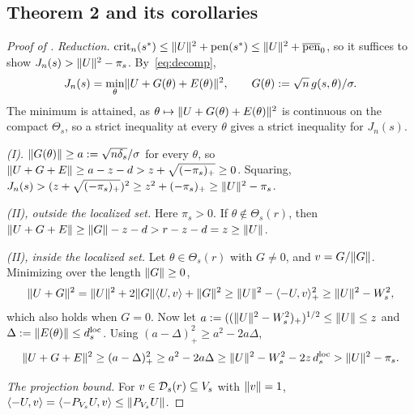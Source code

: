 \subsection{Theorem 2 and its corollaries}
\label{app:thm2}

\begin{proof}[Proof of ]
\emph{Reduction.} $\mathrm{crit}_n(s^*) \le \lVert U\rVert^2 + \mathrm{pen}(s^*) \le \lVert U\rVert^2 + \overline{\mathrm{pen}}_0$, so it suffices to show $J_n(s) > \lVert U\rVert^2 - \pi_s$. By~\eqref{eq:decomp},
\[
J_n(s) = \min_\theta\lVert U + G(\theta) + E(\theta)\rVert^2, \qquad G(\theta) := \sqrt n\,g(s,\theta)/\sigma.
\]
The minimum is attained, as $\theta \mapsto \lVert U + G(\theta) + E(\theta)\rVert^2$ is continuous on the compact $\Theta_s$, so a strict inequality at every $\theta$ gives a strict inequality for $J_n(s)$.

\emph{(I).} $\lVert G(\theta)\rVert \ge a := \sqrt{n\delta_s}/\sigma$ for every $\theta$, so $\lVert U + G + E\rVert \ge a - z - d > z + \sqrt{(-\pi_s)_+} \ge 0$. Squaring, $J_n(s) > (z + \sqrt{(-\pi_s)_+})^2 \ge z^2 + (-\pi_s)_+ \ge \lVert U\rVert^2 - \pi_s$.

\emph{(II), outside the localized set.} Here $\pi_s > 0$. If $\theta \notin \Theta_s(r)$, then $\lVert U + G + E\rVert \ge \lVert G\rVert - z - d > r - z - d = z \ge \lVert U\rVert$.

\emph{(II), inside the localized set.} Let $\theta \in \Theta_s(r)$ with $G \ne 0$, and $v = G/\lVert G\rVert$. Minimizing over the length $\lVert G\rVert \ge 0$,
\[
\lVert U + G\rVert^2 = \lVert U\rVert^2 + 2\lVert G\rVert\langle U, v\rangle + \lVert G\rVert^2 \ge \lVert U\rVert^2 - \langle -U, v\rangle_+^2 \ge \lVert U\rVert^2 - W_s^2,
\]
which also holds when $G = 0$. Now let $a := ((\lVert U\rVert^2 - W_s^2)_+)^{1/2} \le \lVert U\rVert \le z$ and $\Delta := \lVert E(\theta)\rVert \le d^{\mathrm{loc}}_s$. Using $(a - \Delta)_+^2 \ge a^2 - 2a\Delta$,
\[
\lVert U + G + E\rVert^2 \ge (a - \Delta)_+^2 \ge a^2 - 2a\Delta \ge \lVert U\rVert^2 - W_s^2 - 2z\,d^{\mathrm{loc}}_s > \lVert U\rVert^2 - \pi_s.
\]

\emph{The projection bound.} For $v \in \mathcal{D}_s(r) \subseteq V_s$ with $\lVert v\rVert = 1$, $\langle -U, v\rangle = \langle -P_{V_s}U, v\rangle \le \lVert P_{V_s}U\rVert$.
\end{proof}

